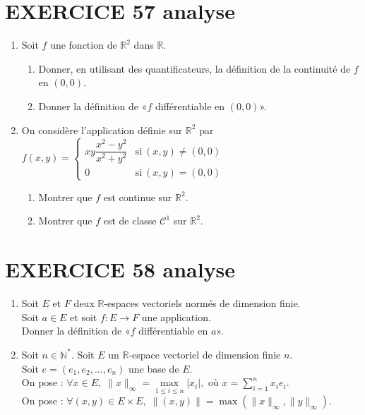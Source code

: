 \documentclass[10pt,oneside]{article}
\begin{document}
\begin{flushleft}
\section*{EXERCICE 57 \:analyse }


\begin{enumerate}
 \item Soit $f $ une fonction de $\mathbb{R}^{2}$ dans $\mathbb{R}$.
 \begin{enumerate}
 \item Donner, en utilisant des quantificateurs, la définition de la continuité de $f$ en $(0,0)$.
 \item Donner la définition de «$f$ différentiable en  $(0,0)$».
 \end{enumerate}
 \item 
On considère l'application définie sur $\mathbb{R}^2$ par 
 $f(x,y)=\left\lbrace
  \begin{array}{ll}
 xy\dfrac{x^2-y^2}{x^2+y^2}& \text{si}\: (x,y)\neq (0,0)\\
 0 &\text{si} \:(x,y)=(0,0)
 \end{array}
 \right. $

 \begin{enumerate}
 \item Montrer que $f$ est continue sur $\mathbb{R}^2$.
 \item Montrer que $f$ est de classe $\mathcal {C}^1$ sur $\mathbb{R}^2$.
 \end{enumerate}
 \end{enumerate}
   

 
\section*{EXERCICE 58 \:analyse }

 \begin{enumerate}
 \item
 Soit $E$ et $F$ deux $\mathbb{R}$-espaces vectoriels normés de dimension finie.\\
  Soit $a\in E$ et soit $f:E \longrightarrow F$ une application.\\

 Donner la définition de «$f$ différentiable en  $a$».
 \item
 Soit $n\in\mathbb{N}^*$. Soit $E$ un $\mathbb{R}$-espace vectoriel de dimension finie $n$.\\
 Soit $e=(e_1,e_2,\dots,e_n)$ une base de $E$.\\
 On  pose :  $\forall x\in E,\; \|x\|_{\infty}=\underset{1\leqslant i\leqslant n}{\max}|x_i|,\mbox{ o\`u }x=\displaystyle\sum_{i=1}^{n}x_ie_i$.\\
On pose :  $ \forall (x,y)\in E\times E,\; \|(x,y)\|=\max(\|x\|_\infty,\|y\|_\infty)$.


\end{enumerate}
\end{flushleft}
\end{document}
